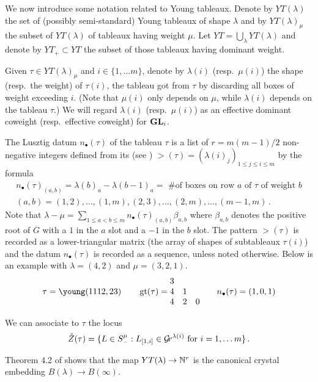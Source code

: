 \documentclass{article}
\begin{document}
We now introduce some notation related to Young tableaux. Denote by $YT(\lambda)$ the set of (possibly semi-standard) Young tableaux of shape $\lambda$ and by $YT(\lambda)_\mu$ the subset of $YT(\lambda)$ of tableaux having weight $\mu$. Let $YT = \bigcup_\lambda YT(\lambda)$ and denote by $YT_+\subset YT$ the subset of those tableaux having dominant weight. 

Given $\tau\in YT(\lambda)_\mu$ and $ i \in \{1, \dots m\} $, denote by $\lambda(i)$ (resp.\ $\mu(i)$) the shape (resp.\ the weight) of $\tau(i)$, the tableau got from $\tau$ by discarding all boxes of weight exceeding $i$. (Note that $ \mu(i)$ only depends on $ \mu$, while $ \lambda(i)$ depends on the tableau $ \tau$.)  We will regard $ \lambda(i)$ (resp.\ $\mu(i)$) as an effective dominant coweight (resp.\ effective coweight) for ${\mathbf{GL}}_i$. 
% 

The Lusztig datum $n_\bullet(\tau)$ of the tableau $\tau$ is a list of $r= m(m-1)/2$ non-negative integers defined from its  (see \cite[Sect.~4]{berenstein1988tensor}) $\gt(\tau) = (\lambda(i)_j)_{1\le j\le i\le m}$ by the formula 
$$
\begin{gathered}
    n_\bullet(\tau)_{(a,b)} = \lambda(b)_a - \lambda(b-1)_a = \text{ \# of boxes on row $a$ of $\tau $ of weight $b$}  \\
    (a,b)                   =  (1,2),\dots,(1,m),
                                (2,3),\dots,(2,m),
                                \dots,
                                (m-1,m)\,. 
\end{gathered}
$$
% 
Note that $ \lambda - \mu = \displaystyle{\sum_{1 \le a < b \le m}n_\bullet(\tau)_{(a,b)} \beta_{a,b}} $ where $ \beta_{a,b} $ denotes the positive root of $ G$ with a $ 1 $ in the $a $ slot and a $-1$ in the $ b $ slot. The pattern $\gt(\tau)$ is recorded as a lower-triangular matrix (the array of shapes of subtableaux $\tau(i)$) and the datum $n_\bullet(\tau)$ is recorded as a sequence, unless noted otherwise. Below is an example with $\lambda = (4,2)$ and $\mu = (3,2,1)$. 
\[
    \tau = \young(1112,23) \qquad \gt(\tau) = 
    \begin{matrix}
        3 \\
        4 & 1 \\ 
        4 & 2 & 0         
    \end{matrix} \qquad n_\bullet(\tau) = (1,0,1) %
\]

We can associate to $\tau$ the locus 
%  
\begin{equation*}
    \mathring Z(\tau) = 
        \{
            L\in S^\mu_- : L_{[1,i]} \in\mathcal{G}\!r^{\lambda(i)}\text{ for } i = 1, \dots m 
        \}\,. 
\end{equation*}
\begin{remark} \label{rem:claxton}
Theorem 4.2 of \cite{claxton2015young} shows that the map $ YT(\lambda) \rightarrow \mathbb N^r $ is the canonical crystal embedding $ B(\lambda) \rightarrow B(\infty)$.
\end{remark}
\end{document}
